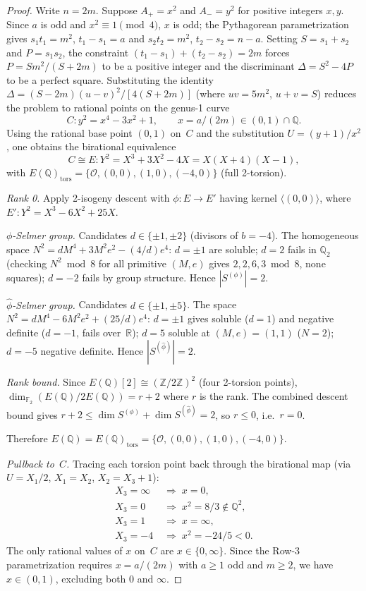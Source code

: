 \documentclass[12pt]{amsart}
\theoremstyle{plain}
\theoremstyle{definition}
\theoremstyle{remark}
\newcommand{\ZZ}{\mathbb{Z}}
\newcommand{\QQ}{\mathbb{Q}}
\newcommand{\RR}{\mathbb{R}}
\newcommand{\FF}{\mathbb{F}}
\newcommand{\Aplus}{A_{+}}
\newcommand{\Aminus}{A_{-}}
\begin{document}
\begin{proof}
Write $n=2m$.  Suppose $\Aplus = x^2$ and $\Aminus = y^2$ for positive integers
$x,y$.  Since $a$ is odd and $x^2\equiv 1\pmod{4}$, $x$ is odd; the Pythagorean
parametrization gives $s_1 t_1 = m^2$, $t_1 - s_1 = a$ and $s_2 t_2 = m^2$,
$t_2 - s_2 = n - a$.  Setting $S = s_1+s_2$ and $P = s_1 s_2$, the constraint
$(t_1-s_1)+(t_2-s_2) = 2m$ forces $P = Sm^2/(S+2m)$ to be a positive integer
and the discriminant $\Delta = S^2-4P$ to be a perfect square.  Substituting
the identity $\Delta = (S-2m)(u-v)^2/[4(S+2m)]$ (where $uv=5m^2$, $u+v=S$)
reduces the problem to rational points on the genus-1 curve
\[
  C : y^2 = x^4 - 3x^2 + 1,\qquad x = a/(2m) \in (0,1)\cap\QQ.
\]
Using the rational base point $(0,1)$ on~$C$ and the substitution
$U=(y+1)/x^2$, one obtains the birational equivalence
\[
  C \cong E: Y^2 = X^3 + 3X^2 - 4X = X(X+4)(X-1),
\]
with $E(\QQ)_{\mathrm{tors}} = \{\mathcal{O},(0,0),(1,0),(-4,0)\}$ (full 2-torsion).

\medskip
\noindent\emph{Rank 0.}  Apply 2-isogeny descent with $\phi:E\to E'$ having
kernel $\langle(0,0)\rangle$, where $E': Y^2=X^3-6X^2+25X$.

\emph{$\phi$-Selmer group.}  Candidates $d\in\{\pm1,\pm2\}$ (divisors of $b=-4$).
The homogeneous space $N^2 = dM^4+3M^2e^2-(4/d)e^4$: $d=\pm1$ are soluble;
$d=2$ fails in $\QQ_2$ (checking $N^2 \bmod 8$ for all primitive $(M,e)$ gives
$2, 2, 6, 3 \bmod 8$, none squares); $d=-2$ fails by group structure.
Hence $|S^{(\phi)}|=2$.

\emph{$\hat\phi$-Selmer group.}  Candidates $d\in\{\pm1,\pm5\}$.
The space $N^2 = dM^4-6M^2e^2+(25/d)e^4$: $d=\pm1$ gives soluble ($d=1$) and
negative definite ($d=-1$, fails over~$\RR$); $d=5$ soluble at $(M,e)=(1,1)$
($N=2$); $d=-5$ negative definite.  Hence $|S^{(\hat\phi)}|=2$.

\emph{Rank bound.}  Since $E(\QQ)[2]\cong(\ZZ/2\ZZ)^2$ (four 2-torsion points),
$\dim_{\FF_2}(E(\QQ)/2E(\QQ)) = r + 2$ where $r$ is the rank.  The combined
descent bound gives $r + 2 \leq \dim S^{(\phi)} + \dim S^{(\hat\phi)} = 2$,
so $r \leq 0$, i.e.\ $r = 0$.

Therefore $E(\QQ) = E(\QQ)_{\mathrm{tors}}=\{\mathcal{O},(0,0),(1,0),(-4,0)\}$.

\medskip
\noindent\emph{Pullback to~$C$.}  Tracing each torsion point back through
the birational map (via $U=X_1/2$, $X_1=X_2$, $X_2=X_3+1$):
\begin{align*}
  X_3=\infty &\;\Rightarrow\; x = 0,\\
  X_3=0      &\;\Rightarrow\; x^2 = 8/3\notin\QQ^2,\\
  X_3=1      &\;\Rightarrow\; x = \infty,\\
  X_3=-4     &\;\Rightarrow\; x^2 = -24/5 < 0.
\end{align*}
The only rational values of $x$ on~$C$ are $x\in\{0,\infty\}$.
Since the Row-3 parametrization requires $x = a/(2m)$ with $a\geq1$ odd and
$m\geq2$, we have $x\in(0,1)$, excluding both $0$ and $\infty$.
\end{proof}
\end{document}
